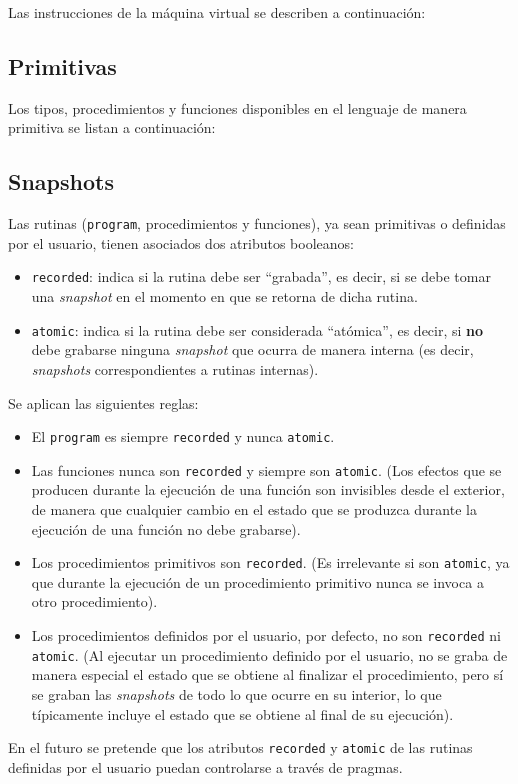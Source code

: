 \documentclass{article}
\begin{document}
Las instrucciones de la m\'aquina virtual se describen a continuaci\'on:



\subsection{Primitivas}

Los tipos, procedimientos y funciones disponibles en el lenguaje de manera primitiva se listan a continuaci\'on:



\subsection{Snapshots}

Las rutinas (\texttt{program}, procedimientos y funciones),
ya sean primitivas o definidas por el usuario,
tienen asociados dos atributos booleanos:
\begin{itemize}
\item \texttt{recorded}:
      indica si la rutina debe ser ``grabada'', es decir,
      si se debe tomar una {\em snapshot} en el momento en que se retorna de dicha rutina.
\item \texttt{atomic}:
      indica si la rutina debe ser considerada ``at\'omica'', es decir,
      si {\bf no} debe grabarse ninguna {\em snapshot} que ocurra de manera interna
      (es decir, {\em snapshots} correspondientes a rutinas internas).
\end{itemize}
Se aplican las siguientes reglas:
\begin{itemize}
\item El \texttt{program} es siempre \texttt{recorded} y nunca \texttt{atomic}.
\item Las funciones nunca son \texttt{recorded} y siempre son \texttt{atomic}.
      (Los efectos que se producen durante la ejecuci\'on de una funci\'on
      son invisibles desde el exterior, de manera que cualquier cambio en el estado
      que se produzca durante la ejecuci\'on de una funci\'on no debe grabarse).
\item Los procedimientos primitivos son \texttt{recorded}.
      (Es irrelevante si son \texttt{atomic}, ya que durante la ejecuci\'on de un procedimiento
      primitivo nunca se invoca a otro procedimiento).
\item Los procedimientos definidos por el usuario, por defecto,
      no son \texttt{recorded} ni \texttt{atomic}.
      (Al ejecutar un procedimiento definido por el usuario, no se graba
      de manera especial el estado que se obtiene al finalizar el procedimiento,
      pero s\'i se graban las {\em snapshots} de todo lo que ocurre en su interior,
      lo que t\'ipicamente incluye el estado que se obtiene al final de su ejecuci\'on).
\end{itemize}
En el futuro se pretende que los atributos \texttt{recorded} y \texttt{atomic}
de las rutinas definidas por el usuario puedan controlarse a trav\'es de pragmas.
\end{document}

